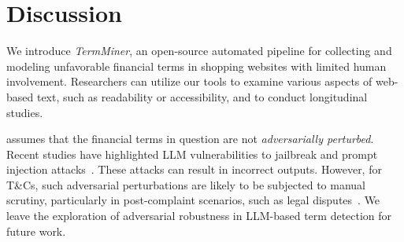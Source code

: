 \section{Discussion}
\label{sec:limitation}


We introduce \textit{TermMiner}, an open-source automated pipeline for collecting and modeling unfavorable financial terms in shopping websites with limited human involvement. Researchers can utilize our tools to examine various aspects of web-based text, such as readability or accessibility, and to conduct longitudinal studies. 
 


\platform assumes that the financial terms in question are not \textit{adversarially perturbed}. Recent studies have highlighted LLM vulnerabilities to jailbreak and prompt injection attacks~\citep{zou2023universal, liu2023autodan, greshake2023not}. These attacks can result in incorrect outputs. However, for T\&Cs, such adversarial perturbations are likely to be subjected to manual scrutiny, particularly in post-complaint scenarios, such as legal disputes~\citep{celsius}. We leave the exploration of adversarial robustness in LLM-based \termname term detection for future work.












